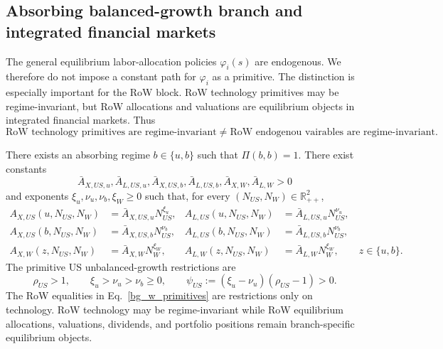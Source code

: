 \documentclass{article}
\begin{document}
\subsection{Absorbing balanced-growth branch and integrated financial markets}

The general equilibrium labor-allocation policies $\varphi_i(s)$ are endogenous. We therefore do not impose a constant path for $\varphi_i$ as a primitive. The distinction is especially important for the RoW block. RoW technology primitives may be regime-invariant, but RoW allocations and valuations are equilibrium objects in integrated financial markets. Thus
\[
\text{RoW technology primitives are regime-invariant} 
\neq
\text{RoW endogenou vairables are regime-invariant}.
\]

\begin{ass}\label{ass_absorbing_bg_technology_primitives}
There exists an absorbing regime $b\in\{u,b\}$ such that $\Pi(b,b)=1$. There exist constants
\[
\bar A_{X,US,u},\bar A_{L,US,u},\bar A_{X,US,b},\bar A_{L,US,b},\bar A_{X,W},\bar A_{L,W}>0
\]
and exponents $\xi_u,\nu_u,\nu_b,\xi_W\ge0$ such that, for every $(N_{US},N_W)\in\mathbb R_{++}^2$,
\begin{align}
A_{X,US}(u,N_{US},N_W)&=\bar A_{X,US,u}N_{US}^{\xi_u},
&
A_{L,US}(u,N_{US},N_W)&=\bar A_{L,US,u}N_{US}^{\nu_u},
\label{US_u_productivity_primitives}\\
A_{X,US}(b,N_{US},N_W)&=\bar A_{X,US,b}N_{US}^{\nu_b},
&
A_{L,US}(b,N_{US},N_W)&=\bar A_{L,US,b}N_{US}^{\nu_b},
\label{bg_us_primitives}\\
A_{X,W}(z,N_{US},N_W)&=\bar A_{X,W}N_W^{\xi_W},
&
A_{L,W}(z,N_{US},N_W)&=\bar A_{L,W}N_W^{\xi_W},
\qquad z\in\{u,b\}.
\label{bg_w_primitives}
\end{align}
The primitive US unbalanced-growth restrictions are
\begin{equation}\label{psi_US_def}
\rho_{US}>1,
\qquad
\xi_u>\nu_u>\nu_b\ge0,
\qquad
\psi_{US}:=(\xi_u-\nu_u)(\rho_{US}-1)>0.
\end{equation}
The RoW equalities in Eq.~\eqref{bg_w_primitives} are restrictions only on technology. RoW technology may be regime-invariant while RoW equilibrium allocations, valuations, dividends, and portfolio positions remain branch-specific equilibrium objects.
\end{ass}
\end{document}
